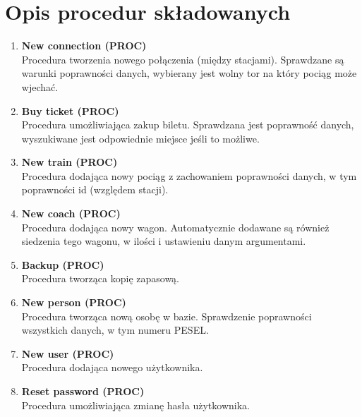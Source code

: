 \section{Opis procedur składowanych}
\begin{enumerate}
    \item \textbf{New connection (PROC)}\\
    Procedura tworzenia nowego połączenia (między stacjami). Sprawdzane są warunki poprawności danych, wybierany jest wolny tor na który pociąg może wjechać.\\
    
    
    \item \textbf{Buy ticket (PROC)}\\
    Procedura umożliwiająca zakup biletu. Sprawdzana jest poprawność danych, wyszukiwane jest odpowiednie miejsce jeśli to możliwe.
    
    \item \textbf{New train (PROC)}\\
    Procedura dodająca nowy pociąg z zachowaniem poprawności danych, w tym poprawności id (względem stacji).\\
    
    \item \textbf{New coach (PROC)}\\
    Procedura dodająca nowy wagon. Automatycznie dodawane są również siedzenia tego wagonu, w ilości i ustawieniu danym argumentami.
        
    \item \textbf{Backup (PROC)}\\
    Procedura tworząca kopię zapasową.\\
    
    \item \textbf{New person (PROC)}\\
    Procedura tworząca nową osobę w bazie. Sprawdzenie poprawności wszystkich danych, w tym numeru PESEL.\\
    
    \item \textbf{New user (PROC)}\\
    Procedura dodająca nowego użytkownika.\\ 
    
    \item \textbf{Reset password (PROC)}\\
    Procedura umożliwiająca zmianę hasła użytkownika.\\
    
\end{enumerate}

